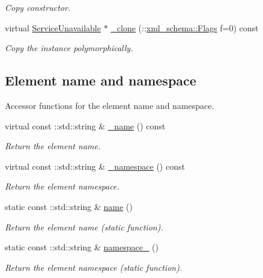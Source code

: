 \begin{DoxyCompactItemize}
\begin{DoxyCompactList}\small\item\em Copy constructor. \item\end{DoxyCompactList}\item 
virtual \hyperlink{classopenstack_1_1xml_1_1ServiceUnavailable}{ServiceUnavailable} $\ast$ \hyperlink{classopenstack_1_1xml_1_1ServiceUnavailable_af934699999ad8a96942c351ccc8cb828}{\_\-clone} (::\hyperlink{namespacexml__schema_affb4c227cbd9aa7453dd1dc5a1401943}{xml\_\-schema::Flags} f=0) const 
\begin{DoxyCompactList}\small\item\em Copy the instance polymorphically. \item\end{DoxyCompactList}\end{DoxyCompactItemize}
\subsection*{Element name and namespace}
\label{_amgrpd4b5b61f6e07390f4af2465e04571f34}
Accessor functions for the element name and namespace. \begin{DoxyCompactItemize}
\item 
virtual const ::std::string \& \hyperlink{classopenstack_1_1xml_1_1ServiceUnavailable_af12cc5bffbff7e14be8878a67cd4167c}{\_\-name} () const 
\begin{DoxyCompactList}\small\item\em Return the element name. \item\end{DoxyCompactList}\item 
virtual const ::std::string \& \hyperlink{classopenstack_1_1xml_1_1ServiceUnavailable_ac9d90d56e271cee3046b4d512d555724}{\_\-namespace} () const 
\begin{DoxyCompactList}\small\item\em Return the element namespace. \item\end{DoxyCompactList}\item 
static const ::std::string \& \hyperlink{classopenstack_1_1xml_1_1ServiceUnavailable_a33bc5b4e0ea493a8ea3ac747f81c9bd3}{name} ()
\begin{DoxyCompactList}\small\item\em Return the element name (static function). \item\end{DoxyCompactList}\item 
static const ::std::string \& \hyperlink{classopenstack_1_1xml_1_1ServiceUnavailable_a539c34410d055b7a95f85d9d802180b3}{namespace\_\-} ()
\begin{DoxyCompactList}\small\item\em Return the element namespace (static function). \item\end{DoxyCompactList}\end{DoxyCompactItemize}


